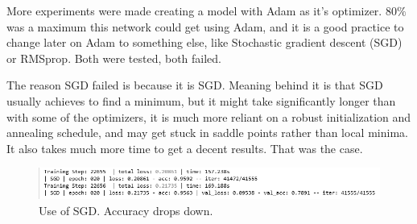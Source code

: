 \documentclass[conference]{IEEEtran}
\begin{document}
More experiments were made creating a model with Adam as it's optimizer. $80\%$ was a maximum this network could get using Adam, and  it is a good practice to change later on Adam to something else, like Stochastic gradient descent (SGD) or RMSprop. Both were tested, both failed.

The reason SGD failed is because it is SGD. Meaning behind it is that SGD usually achieves to find a minimum, but it might take significantly longer than with some of the optimizers, it is much more reliant on a robust initialization and annealing schedule, and may get stuck in saddle points rather than local minima. It also takes much more time to get a decent results. That was the case.

\begin{figure}[hbt!]
 \centering
    \includegraphics[scale=0.46]{sgd-b.png}
        \caption{Use of SGD. Accuracy drops down.}
	    \label{fig:my_label}
\end{figure}
\end{document}

